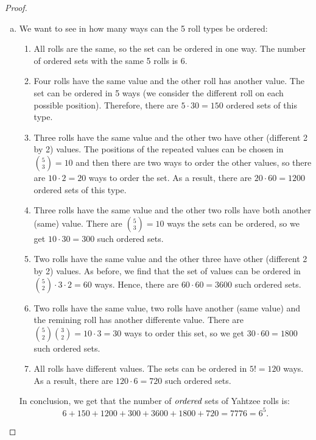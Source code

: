 \begin{proof}
\begin{enumerate}[(a)]
        \item We want to see in how many ways can the 5 roll types be ordered:
            \begin{enumerate}[(1)]
                \item All rolls are the same, so the set can be ordered in one way. The number of 
                    ordered sets with the same 5 rolls is 6.

                \item Four rolls have the same value and the other roll has another value.
                    The set can be ordered in 5 ways (we consider the different roll on each
                    possible position). Therefore, there are $5 \cdot 30 = 150$ ordered sets of this type.

                \item Three rolls have the same value and the other two have other (different 2 by 2) values.
                    The positions of the repeated values can be chosen in $\binom{5}{3} = 10$ and then there 
                    are two ways to order the other values, so there are $10 \cdot 2 = 20$ ways to order the set.
                    As a result, there are $20 \cdot 60 = 1200$ ordered sets of this type.

                \item Three rolls have the same value and the other two rolls have both another (same) value.
                    There are $\binom{5}{3} = 10$ ways the sets can be ordered, so we get $10 \cdot 30 = 300$
                    such ordered sets.

                \item Two rolls have the same value and the other three have other (different 2 by 2) values.
                    As before, we find that the set of values can be ordered in 
                    $\binom{5}{2} \cdot 3 \cdot 2 = 60$ ways.
                    Hence, there are $60 \cdot 60 = 3600$ such ordered sets.

                \item Two rolls have the same value, two rolls have another (same value) and the 
                    remining roll has another differente value. There are 
                    $\binom{5}{2}\binom{3}{2} = 10 \cdot 3 = 30$ ways to order this set, so we get 
                    $30 \cdot 60 = 1800$ such ordered sets.

                \item All rolls have different values. The sets can be ordered in $5! = 120$ ways. As a result,
                    there are $120 \cdot 6 = 720$ such ordered sets.
            \end{enumerate}

            In conclusion, we get that the number of $\emph{ordered}$ sets of Yahtzee rolls is:
             \[
                6 + 150 + 1200 + 300 + 3600 + 1800 + 720 = 7776 = 6^5
            .\] 
        \end{enumerate}
    \end{proof}

